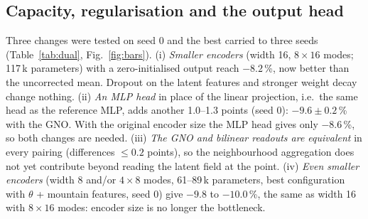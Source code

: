 \documentclass[10pt,a4paper]{article}
\begin{document}
\subsection{Capacity, regularisation and the output head}
Three changes were tested on seed 0 and the best carried to three seeds (Table~\ref{tab:dual},
Fig.~\ref{fig:bars}). (i) \emph{Smaller encoders} (width 16, $8\times16$ modes; 117\,k parameters)
with a zero-initialised output reach $-8.2$\,\%, now better than the uncorrected mean. Dropout on the
latent features and stronger weight decay change nothing. (ii) \emph{An MLP head} in place of the
linear projection, i.e.\ the same head as the reference MLP, adds another 1.0--1.3 points (seed 0): $-9.6\pm0.2$\,\%
with the GNO. With the original encoder size the MLP head gives only $-8.6$\,\%, so both changes are
needed. (iii) \emph{The GNO and bilinear readouts are equivalent} in every pairing (differences
$\le0.2$ points), so the neighbourhood aggregation does not yet contribute beyond reading the latent
field at the point. (iv) \emph{Even smaller encoders} (width 8 and/or $4\times8$ modes, 61--89\,k
parameters, best configuration with $\theta$ + mountain features, seed 0) give $-9.8$ to $-10.0$\,\%,
the same as width 16 with $8\times16$ modes: encoder size is no longer the bottleneck.
\end{document}
